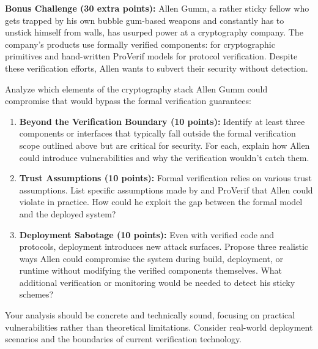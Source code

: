 \documentclass[10pt,a4paper,american]{article}
\begin{document}
\begin{tcolorbox}[colframe=EarthBrown!30!white,colback=EarthBrown!5!white]
	\textbf{Bonus Challenge (30 extra points):} Allen Gumm, a rather sticky fellow who gets trapped by his own bubble gum-based weapons and constantly has to unstick himself from walls, has usurped power at a cryptography company. The company's products use formally verified components: \haclstar for cryptographic primitives and hand-written ProVerif models for protocol verification. Despite these verification efforts, Allen wants to subvert their security without detection.

	Analyze which elements of the cryptography stack Allen Gumm could compromise that would bypass the formal verification guarantees:
	\begin{enumerate}
		\item \textbf{Beyond the Verification Boundary (10 points):} Identify at least three components or interfaces that typically fall outside the formal verification scope outlined above but are critical for security. For each, explain how Allen could introduce vulnerabilities and why the verification wouldn't catch them.

		\item \textbf{Trust Assumptions (10 points):} Formal verification relies on various trust assumptions. List specific assumptions made by \haclstar and ProVerif that Allen could violate in practice. How could he exploit the gap between the formal model and the deployed system?

		\item \textbf{Deployment Sabotage (10 points):} Even with verified code and protocols, deployment introduces new attack surfaces. Propose three realistic ways Allen could compromise the system during build, deployment, or runtime without modifying the verified components themselves. What additional verification or monitoring would be needed to detect his sticky schemes?
	\end{enumerate}

	Your analysis should be concrete and technically sound, focusing on practical vulnerabilities rather than theoretical limitations. Consider real-world deployment scenarios and the boundaries of current verification technology.
\end{tcolorbox}
\end{document}
